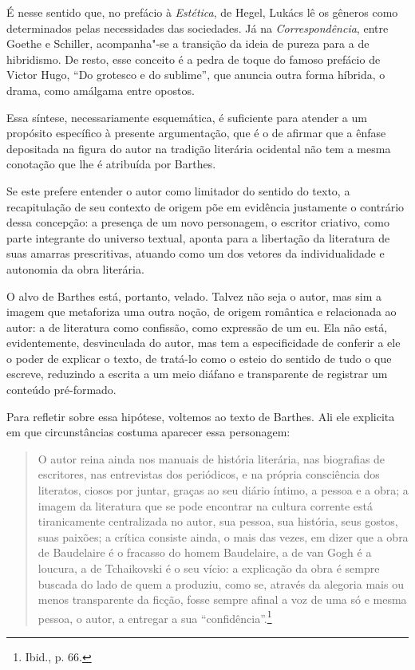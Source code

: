 É nesse sentido que, no prefácio à \emph{Estética}, de Hegel, Lukács lê os gêneros como determinados pelas necessidades das sociedades. Já na
\emph{Correspondência}, entre Goethe e Schiller, acompanha"-se a transição da
ideia de pureza para a de hibridismo. De resto, esse conceito é a pedra
de toque do famoso prefácio de Victor Hugo, ``Do grotesco e do
sublime'', que anuncia outra forma híbrida, o drama, como amálgama entre
opostos.

Essa síntese, necessariamente esquemática, é suficiente para atender a
um propósito específico à presente argumentação, que é o de afirmar que
a ênfase depositada na figura do autor na tradição literária ocidental
não tem a mesma conotação que lhe é atribuída por Barthes.

Se este prefere entender o autor como limitador do sentido do texto, a
recapitulação de seu contexto de origem põe em evidência justamente o
contrário dessa concepção: a presença de um novo personagem, o escritor
criativo, como parte integrante do universo textual, aponta para a
libertação da literatura de suas amarras prescritivas, atuando como um
dos vetores da individualidade e autonomia da obra literária.

O alvo de Barthes está, portanto, velado. Talvez não seja o autor, mas
sim a imagem que metaforiza uma outra noção, de origem romântica e
relacionada ao autor: a de literatura como confissão, como expressão de
um eu. Ela não está, evidentemente, desvinculada do autor, mas tem a
especificidade de conferir a ele o poder de explicar o texto, de
tratá-lo como o esteio do sentido de tudo o que escreve, reduzindo a
escrita a um meio diáfano e transparente de registrar um conteúdo
pré-formado.

Para refletir sobre essa hipótese, voltemos ao texto de Barthes. Ali ele
explicita em que circunstâncias costuma aparecer essa personagem:

\begin{quote}
O autor reina ainda nos manuais de história literária, nas biografias de
escritores, nas entrevistas dos periódicos, e na própria consciência dos
literatos, ciosos por juntar, graças ao seu diário íntimo, a pessoa e a
obra; a imagem da literatura que se pode encontrar na cultura corrente
está tiranicamente centralizada no autor, sua pessoa, sua história, seus
gostos, suas paixões; a crítica consiste ainda, o mais das vezes, em
dizer que a obra de Baudelaire é o fracasso do homem Baudelaire, a de
van Gogh é a loucura, a de Tchaikovski é o seu vício: a explicação da
obra é sempre buscada do lado de quem a produziu, como se, através da
alegoria mais ou menos transparente da ficção, fosse sempre afinal a voz
de uma só e mesma pessoa, o autor, a entregar a sua
``confidência''.\footnote{Ibid., p. 66.}
\end{quote}

